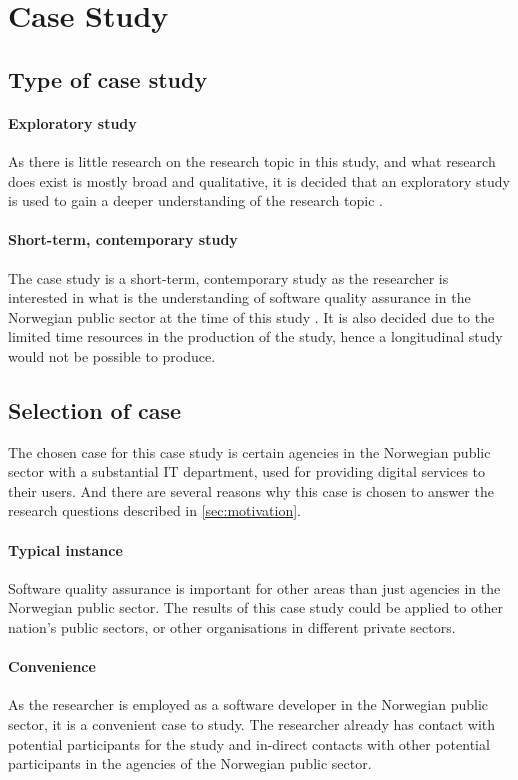 \section{Case Study}

\subsection{Type of case study}
\paragraph{Exploratory study}
As there is little research on the research topic in this study, and what research does exist is mostly broad and qualitative, it is decided that an exploratory study is used to gain a deeper understanding of the research topic \cite{bjo_2022}.

\paragraph{Short-term, contemporary study} 
The case study is a short-term, contemporary study as the researcher is interested in what is the understanding of software quality assurance in the Norwegian public sector at the time of this study \cite{bjo_2022}. It is also decided due to the limited time resources in the production of the study, hence a longitudinal study would not be possible to produce.

\subsection{Selection of case}
The chosen case for this case study is certain agencies in the Norwegian public sector with a substantial IT department, used for providing digital services to their users. And there are several reasons why this case is chosen to answer the research questions described in \autoref{sec:motivation}.

\paragraph{Typical instance}
Software quality assurance is important for other areas than just agencies in the Norwegian public sector. The results of this case study could be applied to other nation's public sectors, or other organisations in different private sectors.

\paragraph{Convenience}
As the researcher is employed as a software developer in the Norwegian public sector, it is a convenient case to study. The researcher already has contact with potential participants for the study and in-direct contacts with other potential participants in the agencies of the Norwegian public sector.

